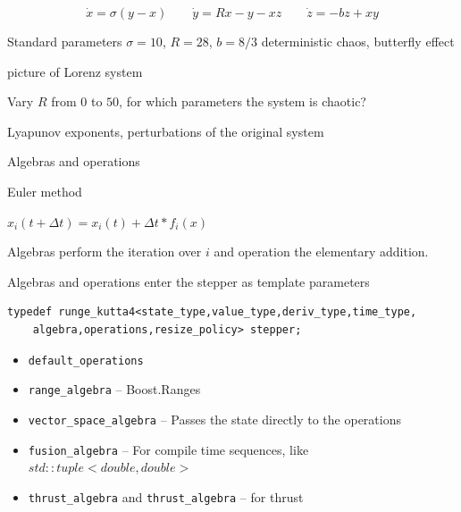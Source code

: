 \begin{frame}[fragile]

 \begin{equation}
  \dot{x} = \sigma ( y - x ) \quad \quad \dot{y} = R x - y - x z \quad \quad \dot{z} = -b z + x y
 \end{equation}

Standard parameters $\sigma=10$, $R=28$, $b=8/3$ deterministic chaos, butterfly effect

picture of Lorenz system

\end{frame}


\begin{frame}[fragile]

Vary $R$ from $0$ to $50$, for which parameters the system is chaotic?

Lyapunov exponents, perturbations of the original system

\end{frame}





\begin{frame}[fragile]

Algebras and operations

Euler method

$ x_i(t+\Delta t) = x_i(t) + \Delta t * f_i(x)$

Algebras perform the iteration over $i$ and operation the elementary addition.

Algebras and operations enter the stepper as template parameters

\begin{lstlisting}
typedef runge_kutta4<state_type,value_type,deriv_type,time_type,
    algebra,operations,resize_policy> stepper; 
\end{lstlisting}

\begin{itemize}
 \item {\tt default\_operations}
 \item {\tt range\_algebra} -- Boost.Ranges
 \item {\tt vector\_space\_algebra} -- Passes the state directly to the operations
 \item {\tt fusion\_algebra} -- For compile time sequences, like $std::tuple< double , double >$
 \item {\tt thrust\_algebra} and {\tt thrust\_algebra} -- for thrust
\end{itemize}

\end{frame}


